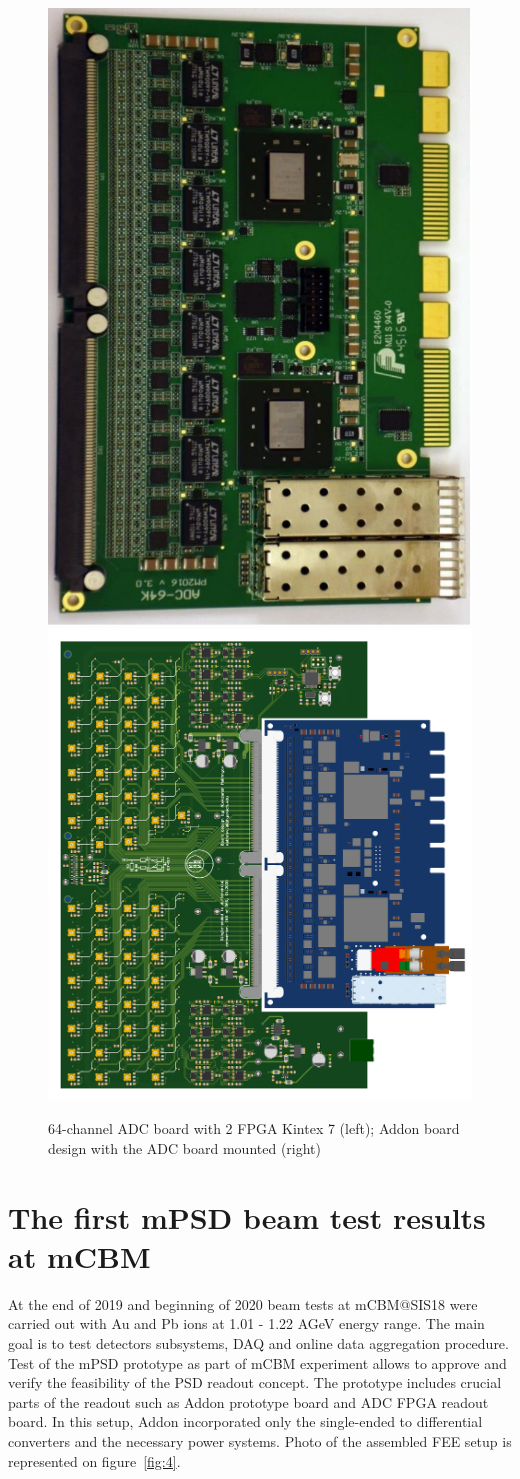 \documentclass[a4paper,11pt]{article}
\begin{document}
\begin{figure}[htbp]
	\centering
	\includegraphics[width=.3\textwidth]{ADC_board.png}
	\quad
	\includegraphics[width=.4\textwidth]{ADC_addon.png}
	\caption{\label{fig:3} 64-channel ADC board with 2 FPGA Kintex 7 (left); Addon board design with the ADC board mounted (right)}
\end{figure}

\section{ The first mPSD beam test results at mCBM}
At the end of 2019 and beginning of 2020 beam tests at mCBM@SIS18 were carried out with Au and Pb ions at 1.01 - 1.22 AGeV energy range. The main goal is to test detectors subsystems, DAQ and online data aggregation procedure. Test of the mPSD prototype as part of mCBM experiment allows to approve and verify the feasibility of the PSD readout concept. The prototype includes crucial parts of the readout such as Addon prototype board and ADC FPGA readout board. In this setup, Addon incorporated only the single-ended to differential converters and the necessary power systems. Photo of the assembled FEE setup is represented on figure~\ref{fig:4}.
\end{document}
